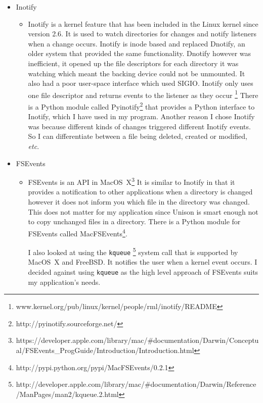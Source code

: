 \documentclass[12pt]{article}
\begin{document}
\begin{itemize}
    \item Inotify
        \begin{itemize}
        \item Inotify is a kernel feature that has been
        included in the Linux kernel since version 2.6.
        It is used to watch directories for changes
        and notify listeners when a change occurs. Inotify
        is inode based and replaced Dnotify, an older system
        that provided the same functionality. Dnotify however was
        inefficient, it opened up the file descriptors for
        each directory it was watching which meant the backing
        device could not be unmounted. 
        It also had a poor
        user-space interface which used SIGIO. Inotify only
        uses one file descriptor and returns events to the
        listener as they occur
        \footnote{www.kernel.org/pub/linux/kernel/people/rml/inotify/README}
        There is a Python module
        called Pyinotify\footnote{http://pyinotify.sourceforge.net/}
        that provides a Python interface
        to Inotify, which I have used in my program.
        Another reason I chose Inotify was because different kinds
        of changes triggered different Inotify events. So I
        can differentiate between a file being deleted, created
        or modified, \emph{etc}.
        \end{itemize}

    \item FSEvents
        \begin{itemize}
        \item FSEvents is an API in 
        MacOS~X\footnote{https://developer.apple.com/library/mac/\#documentation/Darwin/Conceptual/FSEvents\_ProgGuide/Introduction/Introduction.html}
        It is similar
        to Inotify in that it provides a notification to other
        applications when a directory is changed however
        it does not inform you which file in the directory
        was changed. This does not matter for my
        application since Unison is smart enough not to copy
        unchanged files in a directory. There is a Python module
        for FSEvents called
        MacFSEvents\footnote{http://pypi.python.org/pypi/MacFSEvents/0.2.1}. 
        
        I also looked at using the \texttt{kqueue}
        \footnote{http://developer.apple.com/library/mac/\#documentation/Darwin/Reference/ManPages/man2/kqueue.2.html}
        system call that is
        supported by MacOS~X and FreeBSD. It notifies the user
        when a kernel event occurs. I decided against using
        \texttt{kqueue} as the high level approach of FSEvents
        suits my application's needs.
        \end{itemize}


\end{itemize}
\end{document}
